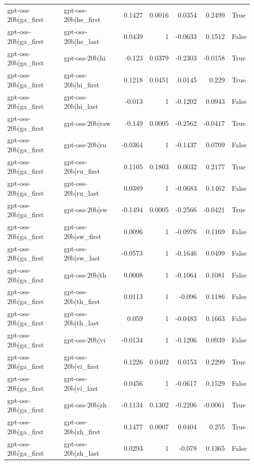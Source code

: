 \begin{table}
\begin{tabular}{l l r r r r l}
gpt-oss-20b|ga_first & gpt-oss-20b|he_first & 0.1427 & 0.0016 & 0.0354 & 0.2499 & True \\
gpt-oss-20b|ga_first & gpt-oss-20b|he_last & 0.0439 & 1 & -0.0633 & 0.1512 & False \\
gpt-oss-20b|ga_first & gpt-oss-20b|hi & -0.123 & 0.0379 & -0.2303 & -0.0158 & True \\
gpt-oss-20b|ga_first & gpt-oss-20b|hi_first & 0.1218 & 0.0451 & 0.0145 & 0.229 & True \\
gpt-oss-20b|ga_first & gpt-oss-20b|hi_last & -0.013 & 1 & -0.1202 & 0.0943 & False \\
gpt-oss-20b|ga_first & gpt-oss-20b|raw & -0.149 & 0.0005 & -0.2562 & -0.0417 & True \\
gpt-oss-20b|ga_first & gpt-oss-20b|ru & -0.0364 & 1 & -0.1437 & 0.0709 & False \\
gpt-oss-20b|ga_first & gpt-oss-20b|ru_first & 0.1105 & 0.1803 & 0.0032 & 0.2177 & True \\
gpt-oss-20b|ga_first & gpt-oss-20b|ru_last & 0.0389 & 1 & -0.0683 & 0.1462 & False \\
gpt-oss-20b|ga_first & gpt-oss-20b|sw & -0.1494 & 0.0005 & -0.2566 & -0.0421 & True \\
gpt-oss-20b|ga_first & gpt-oss-20b|sw_first & 0.0096 & 1 & -0.0976 & 0.1169 & False \\
gpt-oss-20b|ga_first & gpt-oss-20b|sw_last & -0.0573 & 1 & -0.1646 & 0.0499 & False \\
gpt-oss-20b|ga_first & gpt-oss-20b|th & 0.0008 & 1 & -0.1064 & 0.1081 & False \\
gpt-oss-20b|ga_first & gpt-oss-20b|th_first & 0.0113 & 1 & -0.096 & 0.1186 & False \\
gpt-oss-20b|ga_first & gpt-oss-20b|th_last & 0.059 & 1 & -0.0483 & 0.1663 & False \\
gpt-oss-20b|ga_first & gpt-oss-20b|vi & -0.0134 & 1 & -0.1206 & 0.0939 & False \\
gpt-oss-20b|ga_first & gpt-oss-20b|vi_first & 0.1226 & 0.0402 & 0.0153 & 0.2299 & True \\
gpt-oss-20b|ga_first & gpt-oss-20b|vi_last & 0.0456 & 1 & -0.0617 & 0.1529 & False \\
gpt-oss-20b|ga_first & gpt-oss-20b|zh & -0.1134 & 0.1302 & -0.2206 & -0.0061 & True \\
gpt-oss-20b|ga_first & gpt-oss-20b|zh_first & 0.1477 & 0.0007 & 0.0404 & 0.255 & True \\
gpt-oss-20b|ga_first & gpt-oss-20b|zh_last & 0.0293 & 1 & -0.078 & 0.1365 & False \\

\end{tabular}
\end{table}
